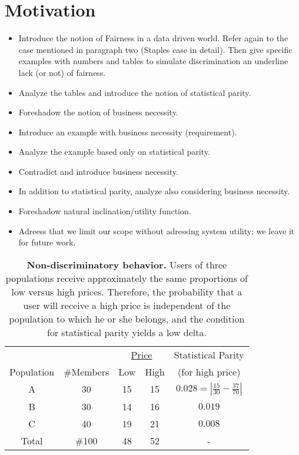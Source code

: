 \section{Motivation}
\begin{itemize}
  \item Introduce the notion of Fairness in a data driven world. Refer again to the case mentioned
    in paragraph two (Staples case in detail). Then give specific examples with numbers and tables
    to simulate discrimination an underline lack (or not) of fairness.
  \item Analyze the tables and introduce the notion of statistical parity.
  \item Foreshadow the notion of business necessity.
  \item Introduce an example with business necessity (requirement).
  \item Analyze the example based only on statistical parity.
  \item Contradict and introduce business necessity.
  \item In addition to statistical parity, analyze also considering
    business necessity.
  \item Foreshadow natural inclination/utility function.
  \item Adreess that we limit our scope without adressing system utility; we leave it for future work.
\end{itemize}



\begin{table}[!h]
{
  \renewcommand{\arraystretch}{1.5}
  \begin{tabular}{ c | c | c  c | c }
    & & \multicolumn{2}{|c|}{\underline{Price}} &  Statistical Parity\\
    Population & \#Members & Low & High & (for high price) \\
    \hline
    A & 30 &  15 & 15 & $0.028 = | \frac{15}{30} - \frac{37}{70}|$ \\
    B & 30 &  14 & 16 & $0.019$ \\
    C & 40 &  19 & 21 & $0.008$ \\
    \hline
    Total & \#100 & 48 & 52 & - \\
  \end{tabular}
  \caption{{\bf Non-discriminatory behavior.} Users of three populations receive approximately
  the same proportions of low versus high prices. Therefore, the probability that a user
  will receive a high price is independent of the population to which he or she belongs,
  and the condition for statistical parity yields a low delta.}
  \label{tab:S}
} \end{table}

